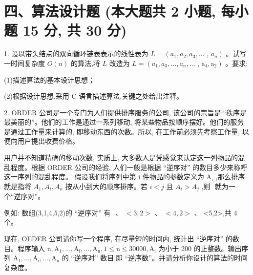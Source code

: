 \section*{四、算法设计题 (本大题共 2 小题, 每小题 15 分, 共 30 分)}

1. 设以带头结点的双向循环链表表示的线性表为 \(L = \left( {{a}_{1},{a}_{2},{a}_{3},\ldots }\right.\) , \(\left. {a}_{n}\right)\) 。试写一时间复杂度 \(O\left( n\right)\) 的算法,将 \(L\) 改造为 \(L = \left( {{a}_{1},{a}_{3},\ldots ,{a}_{n},\ldots }\right.\) , \(\left. {{\mathrm{a}}_{4},{\mathrm{a}}_{2}}\right)\) 。要求:

(1)描述算法的基本设计思想；

(2)根据设计思想,采用 \(\mathrm{C}\) 语言描述算法,关键之处给出注释。
\vspace{15em}

2. ORDER 公司是一个专门为人们提供排序服务的公司, 该公司的宗旨是:“秩序是最美丽的”。他们的工作是通过一系列移动, 将某些物品按顺序摆好。他们的服务是通过工作量来计算的, 即移动东西的次数。所以, 在工作前必须先考察工作量, 以便向用户提出收费价格。

用户并不知道精确的移动次数, 实质上, 大多数人是凭感觉来认定这一列物品的混乱程度。根据 ORDER 公司的经验, 人们一般是根据 “逆序对” 的数目多少来称呼这一序列的混乱程度。 假设我们将序列中第 \(\mathrm{i}\) 件物品的参数定义为 \({\mathrm{A}}_{\mathrm{i}}\) ,那么排序就是指将 \({A}_{1},{A}_{i},{A}_{n}\) 按从小到大的顺序排序。若 \(i < j\) 且 \({A}_{i} > {A}_{j}\) ,则 \(< i,j >\) 就为一个“逆序对”。

例如: 数组(3,1,4,5,2)的 “逆序对” 有 \(< 3,1 > \text{ 、 } < 3,2 > \text{ 、 } < 4,2 >\) 、 <5,2>,共 4 个。

现在, OEDER 公司请你写一个程序, 在尽量短的时间内, 统计出 “逆序对” 的数目。程序输入 \(\mathrm{n},{\mathrm{A}}_{1},\ldots ,{\mathrm{A}}_{\mathrm{i}},\ldots ,{\mathrm{A}}_{\mathrm{n}},1 \leq  \mathrm{n} \leq  {30000},{\mathrm{A}}_{\mathrm{i}}\) 为小于 200 的正整数。输出序列 \({\mathrm{A}}_{1},\ldots ,{\mathrm{A}}_{\mathrm{i}},\ldots ,{\mathrm{A}}_{\mathrm{n}}\) 的 “逆序对” 数目,即 “逆序数”。并请分析你设计的算法的时间复杂度。
